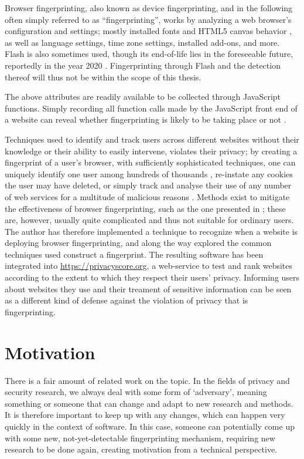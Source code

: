 \documentclass[
    fontsize=12pt,
    headings=small,
    parskip=half,
    bibliography=totoc,
    numbers=noenddot,
    open=any
    ]{scrreprt}
\begin{document}
Browser fingerprinting, also known as device fingerprinting, and in the following often simply referred to as ``fingerprinting'',
works by analyzing a web browser's configuration and settings; mostly installed fonts and HTML5 canvas behavior
\cite{DBLP:conf/ccs/EnglehardtN16}, as well as
language settings, time zone settings, installed add-ons, and more. Flash is also sometimes used, though
its end-of-life lies in the foreseeable future, reportedly in the year
2020 \cite{flash_eol}.
Fingerprinting through Flash and the detection thereof will thus not be within the scope of this thesis.

The above attributes are readily available to be collected through JavaScript functions. Simply recording
all function calls made by the JavaScript front end of a website can reveal whether fingerprinting is likely to
be taking place or not \cite{faiz2014browser, panopticlick}.

Techniques used to identify and track users across different websites without
their knowledge or their ability to easily intervene, violates their privacy; by creating a fingerprint
of a user's browser, with sufficiently sophisticated techniques, one can uniquely identify one user
among hundreds of thousands \cite{am_i_unique}, re-instate any cookies the user may have deleted,
or simply track and analyse their use of any number of web services for a multitude of malicious reasons \cite{eckersley2010unique}.
Methods exist to mitigate the effectiveness of browser fingerprinting, such as the one presented
in \cite{laperdrix2015mitigating};
these are, however, usually quite complicated and thus not suitable for ordinary users.
The author has therefore implemented a technique to recognize when a website is deploying browser fingerprinting,
and along the way explored the common techniques used construct a fingerprint. The resulting software has been integrated into
\url{https://privacyscore.org}, a web-service to test and rank websites according to the extent to which they
respect their users' privacy. Informing users about websites they use and their treament of sensitive information
can be seen as a different kind of defense against the violation of privacy that is fingerprinting.

\section{Motivation}
There is a fair amount of related work on the topic. In the fields of privacy and security research,
we always deal with some form of `adversary', meaning something or someone that can change and adapt to new
research and methods. It is therefore important to keep up with any changes, which can happen very quickly
in the context of software.
In this case, someone can potentially come up with some new, not-yet-detectable fingerprinting mechanism,
requiring new research to be done again, creating motivation from a technical perspective.
\end{document}
